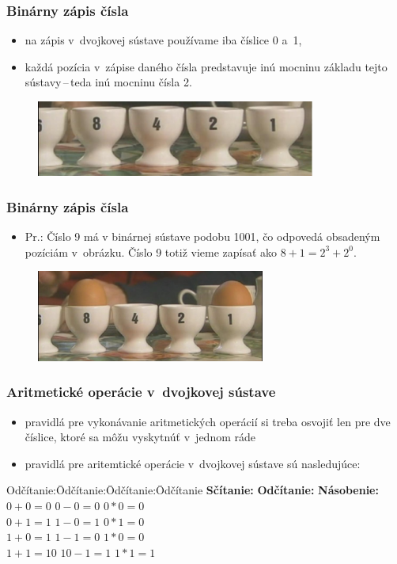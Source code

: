 \documentclass[pdf,slideColor,fyma]{beamer}
\begin{document}
\begin{frame}
\frametitle{Binárny zápis čísla}
\begin{itemize}
	\item na zápis v~dvojkovej sústave používame iba číslice 0 a~1,
	\item každá pozícia v~zápise daného čísla predstavuje inú mocninu základu tejto sústavy\,--\,teda inú mocninu čísla 2.
\end{itemize}
\begin{figure}[h]
	\includegraphics[height=2.5cm]{no_eggs.png}
	\centering
\end{figure}
\end{frame}

\begin{frame}
\frametitle{Binárny zápis čísla}
\begin{itemize}
	\item Pr.: Číslo 9 má v binárnej sústave podobu 1001, čo odpovedá obsadeným pozíciám v~obrázku. Číslo 9 totiž vieme zapísať ako $8+1=2^3+2^0$.
\end{itemize}
\begin{figure}[h]
	\includegraphics[height=3cm]{eggs.png}
	\centering
\end{figure}
\end{frame}

\begin{frame}
\frametitle{Aritmetické operácie v~dvojkovej sústave}
\begin{itemize}
	\item pravidlá pre vykonávanie aritmetických operácií si treba osvojiť len pre dve číslice, ktoré sa môžu vyskytnúť v~jednom ráde
	\item pravidlá pre aritemtické operácie v~dvojkovej sústave sú nasledujúce:
\end{itemize}
\medskip
\begin{center}
\begin{tabbing}
Odčítanie:\qquad \= Odčítanie:\qquad \= Odčítanie:\qquad \= Odčítanie\qquad \kill
\>\textbf{Sčítanie:} \>\textbf{Odčítanie:} \>\textbf{Násobenie:}\\
\>$0+0=0$ \> $0-0=0$ \> $0*0=0$\\
\>$0+1=1$ \> $1-0=1$ \> $0*1=0$\\
\>$1+0=1$ \> $1-1=0$ \> $1*0=0$\\
\>$1+1=10$\> $10-1=1$\> $1*1=1$
\end{tabbing}
\end{center}
\end{frame}
\end{document}
